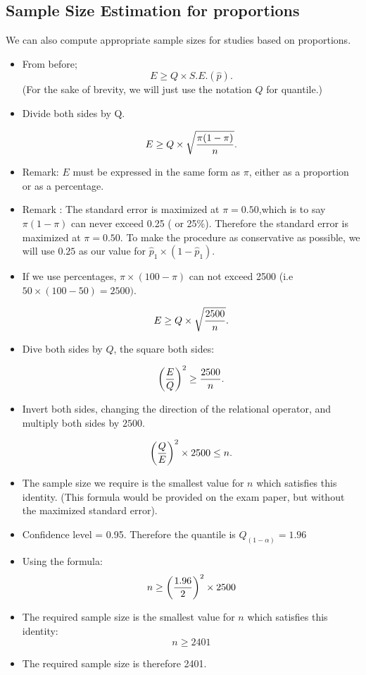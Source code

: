 \documentclass[]{report}
\begin{document}


\subsection{Sample Size Estimation for proportions}
We can also compute appropriate sample sizes for studies based on proportions.
\begin{itemize}
\item From before; \[ E \geq Q \times S.E.(\hat{p}). \]
(For the sake of brevity, we will just use the notation $Q$ for quantile.)

\item Divide both sides by Q.

\[ E \geq Q \times \sqrt{ {\pi(1-\pi)  \over n} }. \]


\item Remark: $E$ must be expressed in the same form as $\pi$, either as a proportion or as a percentage.
\item Remark : The standard error is maximized at $\pi = 0.50$,which is to say $\pi(1-\pi)$ can never exceed 0.25 ( or 25\%). Therefore the standard error is maximized at $\pi = 0.50$. To make the procedure as conservative as possible, we will use $0.25$ as our value for $\hat{p}_1 \times (1 - \hat{p}_1)$.
\item If we use percentages, $\pi \times (100-\pi)$ can not exceed 2500 (i.e $ 50 \times (100-50)=2500)$.

\[ E \geq Q \times \sqrt{{2500 \over n}}. \]




\item Dive both sides by $Q$, the square both sides:

\[ \left({E\over Q}\right)^2 \geq {2500 \over n}. \]

\item Invert both sides, changing the direction of the relational operator, and multiply both sides by $2500$.

\[ \left({Q\over E}\right)^2 \times 2500 \leq n. \]

\item The sample size we require is the smallest value for $n$ which satisfies this identity. (This formula would be provided on the exam paper, but without the maximized standard error).

\item Confidence level = 0.95. Therefore the quantile is $Q_{(1-\alpha)} = 1.96$
\item Using the formula: \[ n \geq \left({1.96 \over 2 }\right)^2 \times 2500  \]
\item The required sample size is the smallest value for $n$ which satisfies this identity: \[ n \geq 2401  \]
\item The required sample size is therefore 2401.
\end{itemize}
\end{document}
